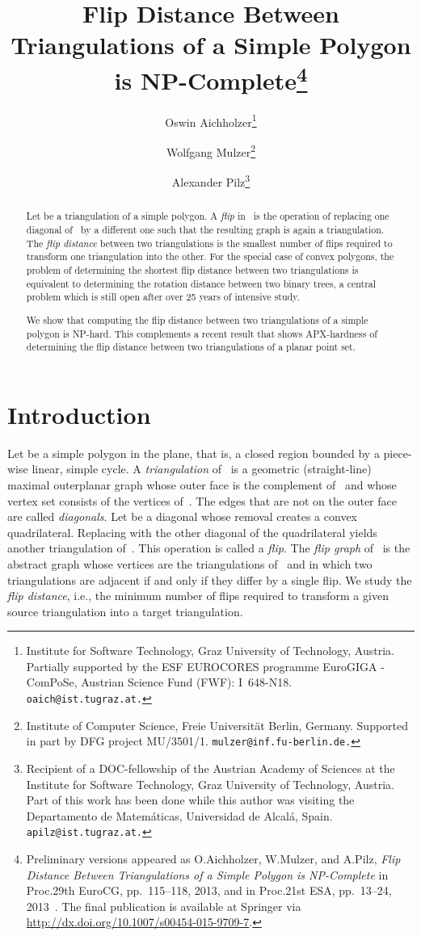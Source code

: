 \documentclass[a4paper,11pt]{article}
\title{Flip Distance Between Triangulations of a Simple Polygon is NP-Complete\thanks{Preliminary versions appeared as O.\@ Aichholzer, W.\@ Mulzer, and
A.\@ Pilz, \emph{Flip Distance Between Triangulations of a Simple 
Polygon is NP-Complete} in Proc.\@ 29th EuroCG, pp.~115--118, 2013, and
in Proc.\@ 21st ESA, pp.~13--24, 
2013~\cite{eurocg_version,esa_version}.
The final publication is available at Springer via
\protect\url{http://dx.doi.org/10.1007/s00454-015-9709-7}.}
}
\author{Oswin Aichholzer\thanks{Institute for Software Technology, Graz 
University of Technology, Austria.
Partially supported by the ESF EUROCORES
programme EuroGIGA - ComPoSe, Austrian Science Fund (FWF): I~648-N18.
\texttt{oaich@ist.tugraz.at.}}
\and Wolfgang Mulzer\thanks{
Institute of Computer Science, Freie Universit\"at Berlin, Germany.
Supported in part by DFG project MU/3501/1.
\texttt{mulzer@inf.fu-berlin.de.}}
\and Alexander Pilz\thanks{Recipient of a DOC-fellowship of the Austrian
Academy of Sciences at the Institute for Software Technology, Graz University
of Technology, Austria.
Part of this work has been done while this author was visiting the 
Departamento de Matem\'aticas, Universidad de Alcal\'a, Spain.
\texttt{apilz@ist.tugraz.at.}}
}
\begin{document}
\maketitle

\begin{abstract}
Let  be a triangulation of a simple polygon.
A \emph{flip} in~ is the operation of replacing one diagonal of~
by a different one such that the resulting graph is again
a triangulation.  The \emph{flip distance} between two triangulations is the smallest
number of flips required to transform one triangulation into the
other.
For the special case of convex polygons,
the problem of determining the shortest flip distance between two triangulations is equivalent to determining the rotation distance between two binary trees, 
a central problem which is still open after over 25 years of intensive study.

We show that computing the flip distance between two
triangulations of a simple polygon is NP-hard.  This complements a recent
result that shows APX-hardness of determining the flip distance between two
triangulations of a planar point set.
\end{abstract}

\section{Introduction}
Let  be a simple polygon in the plane, that is, a closed region bounded by a 
piece-wise linear, simple cycle.  A \emph{triangulation} of~ is a geometric 
(straight-line) maximal outerplanar graph whose outer face is the complement 
of~ and whose vertex set consists of the vertices of~.  The edges
that are not on the outer face are called \emph{diagonals}.  Let  be a diagonal
whose removal creates a convex quadrilateral. Replacing  with the
other diagonal of the quadrilateral yields another triangulation of~.
This operation is called a \emph{flip}.
The \emph{flip graph} of~ is the abstract graph whose vertices are the
triangulations of~ and in which two triangulations are adjacent if and only if
they differ by a single
flip.  We 
study the \emph{flip distance}, i.e., the minimum number
of flips required to transform a given source triangulation into a target
triangulation.
\end{document}
